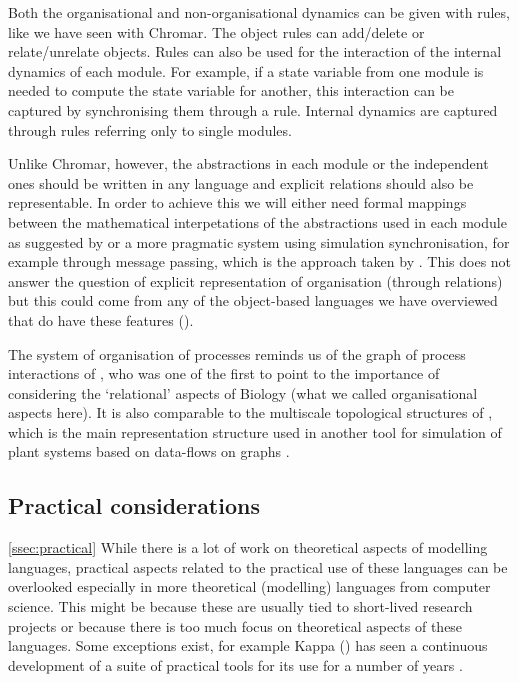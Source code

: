 Both the organisational and non-organisational dynamics can be given with rules,
like we have seen with Chromar. The object rules can add/delete or
relate/unrelate objects. Rules can also be used for the interaction of the
internal dynamics of each module. For example, if a state variable from one
module is needed to compute the state variable for another, this interaction can
be captured by synchronising them through a rule. Internal dynamics are captured
through rules referring only to single modules.

Unlike Chromar, however, the abstractions in each module or the independent ones
should be written in any language and explicit relations should also be
representable. In order to achieve this we will either need formal mappings
between the mathematical interpetations of the abstractions used in each module
as suggested by \citet{mjolsness_prospects_2018} or a more pragmatic system
using simulation synchronisation, for example through message passing, which is
the approach taken by \citet{cis_2018}. This does not answer the question of
explicit representation of organisation (through relations) but this could come
from any of the object-based languages we have overviewed that do have these
features ().

The system of organisation of processes reminds us of the graph of process
interactions of \citet{rashevsky_topology_1954}, who was one of the first to
point to the importance of considering the `relational' aspects of Biology (what
we called organisational aspects here). It is also comparable to the multiscale
topological structures of \citet{godin_multiscale_1998}, which is the main
representation structure used in another tool for simulation of plant systems
based on data-flows on graphs \citep[OpenAlea;][]{pradal_openalea:_2008}.


\subsection{Practical considerations}
\ref{ssec:practical}
While there is a lot of work on theoretical aspects of modelling languages,
practical aspects related to the practical use of these languages can be
overlooked especially in more theoretical (modelling) languages from computer
science. This might be because these are usually tied to short-lived research
projects or because there is too much focus on theoretical aspects of these
languages. Some exceptions exist, for example Kappa () has seen a
continuous development of a suite of practical tools for its use for a number of
years \citep[Kappa platform;][]{boutillier2018kappa}.

